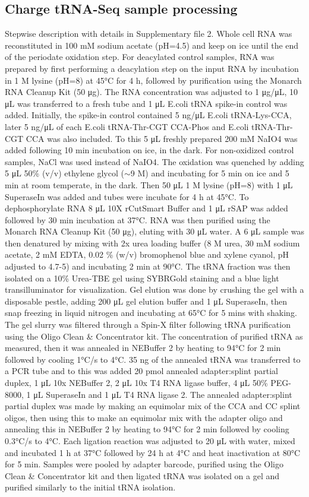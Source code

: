 \documentclass[9pt,lineno]{elife}
\begin{document}
\subsection{Charge tRNA-Seq sample processing}
Stepwise description with details in Supplementary file 2.
Whole cell RNA was reconstituted in 100 mM sodium acetate (pH=4.5) and keep on ice until the end of the periodate oxidation step.
For deacylated control samples, RNA was prepared by first performing a deacylation step on the input RNA by incubation in 1 M lysine (pH=8) at 45°C for 4 h, followed by purification using the Monarch RNA Cleanup Kit (50 μg).
The RNA concentration was adjusted to 1 μg/μL, 10 μL was transferred to a fresh tube and 1 μL E.coli tRNA spike-in control was added.
Initially, the spike-in control contained 5 ng/μL E.coli tRNA-Lys-CCA, later 5 ng/μL of each E.coli tRNA-Thr-CGT CCA-Phos and E.coli tRNA-Thr-CGT CCA was also included.
To this 5 μL freshly prepared 200 mM NaIO4 was added following 10 min incubation on ice, in the dark.
For non-oxidized control samples, NaCl was used instead of NaIO4.
The oxidation was quenched by adding 5 μL 50\% (v/v) ethylene glycol ($\sim$9 M) and incubating for 5 min on ice and 5 min at room temperate, in the dark.
Then 50 μL 1 M lysine (pH=8) with 1 μL SuperaseIn was added and tubes were incubate for 4 h at 45°C.
To dephosphorylate RNA 8 μL 10X rCutSmart Buffer and 1 μL rSAP was added followed by 30 min incubation at 37°C.
RNA was then purified using the Monarch RNA Cleanup Kit (50 μg), eluting with 30 μL water.
A 6 μL sample was then denatured by mixing with 2x urea loading buffer (8 M urea, 30 mM sodium acetate, 2 mM EDTA, 0.02 \% (w/v) bromophenol blue and xylene cyanol, pH adjusted to 4.7-5) and incubating 2 min at 90°C.
The tRNA fraction was then isolated on a 10\% Urea-TBE gel using SYBRGold staining and a blue light transilluminator for visualization.
Gel elution was done by crushing the gel with a disposable pestle, adding 200 μL gel elution buffer and 1 μL SuperaseIn, then snap freezing in liquid nitrogen and incubating at 65°C for 5 mins with shaking.
The gel slurry was filtered through a Spin-X filter following tRNA purification using the Oligo Clean \& Concentrator kit.
The concentration of purified tRNA as measured, then it was annealed in  NEBuffer 2 by heating to 94°C for 2 min followed by cooling 1°C/s to 4°C.
35 ng of the annealed tRNA was transferred to a PCR tube and to this was added 20 pmol annealed adapter:splint partial duplex, 1 μL 10x NEBuffer 2, 2 μL 10x T4 RNA ligase buffer, 4 μL 50\% PEG-8000, 1 μL SuperaseIn and 1 μL T4 RNA ligase 2.
The annealed adapter:splint partial duplex was made by making an equimolar mix of the CCA and CC splint oligos, then using this to make an equimolar mix with the adapter oligo and annealing this in NEBuffer 2 by heating to 94°C for 2 min followed by cooling 0.3°C/s to 4°C.
Each ligation reaction was adjusted to 20 μL with water, mixed and incubated 1 h at 37°C followed by 24 h at 4°C and heat inactivation at 80°C for 5 min.
Samples were pooled by adapter barcode, purified using the Oligo Clean \& Concentrator kit and then ligated tRNA was isolated on a gel and purified similarly to the initial tRNA isolation.
\end{document}
